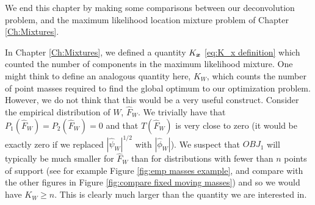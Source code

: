 We end this chapter by making some comparisons between our deconvolution problem, and the maximum likelihood location mixture problem of Chapter \ref{Ch:Mixtures}.

In Chapter \ref{Ch:Mixtures}, we defined a quantity $K_{\bm{{x}}}$ \eqref{eq:K_x definition} which counted the number of components in the maximum likelihood mixture. One might think to define an analogous quantity here, $K_W$, which counts the number of point masses required to find the global optimum to our optimization problem. However, we do not think that this would be a very useful construct. Consider the empirical distribution of $W$, $\hat{F}_W$. We trivially have that $P_1(\hat{F}_W) = P_2(\hat{F}_W) = 0$ and that $T(\hat{F}_W)$ is very close to zero (it would be exactly zero if we replaced $|\hat{\psi}_W|^{1/2}$ with $|\hat{\phi}_W|$). We suspect that $OBJ_1$ will typically be much smaller for $\hat{F}_W$ than for distributions with fewer than $n$ points of support (see for example Figure \ref{fig:emp masses example}, and compare with the other figures in Figure \ref{fig:compare fixed moving masses}) and so we would have $K_W \geq n$. This is clearly much larger than the quantity we are interested in.

